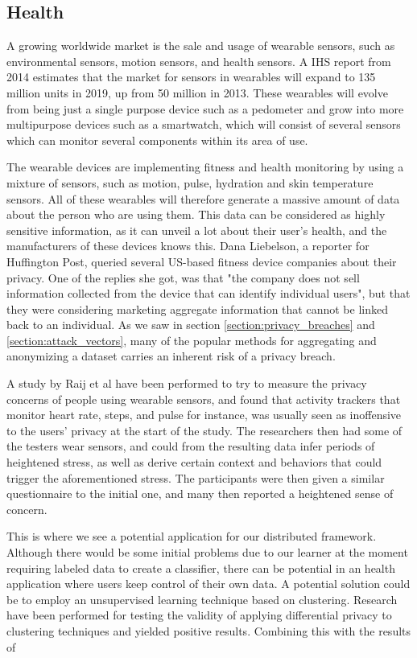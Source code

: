 \subsection{Health}
A growing worldwide market is the sale and usage of wearable sensors, such as environmental sensors, motion sensors, and health sensors. A IHS report \cite{ihs2014reportwearables} from 2014 estimates that the market for sensors in wearables will expand to 135 million units in 2019, up from 50 million in 2013. These wearables will evolve from being just a single purpose device such as a pedometer and grow into more multipurpose devices such as a smartwatch, which will consist of several sensors which can monitor several components within its area of use. 

The wearable devices are implementing fitness and health monitoring by using a mixture of sensors, such as motion, pulse, hydration and skin temperature sensors. All of these wearables will therefore generate a massive amount of data about the person who are using them. This data can be considered as highly sensitive information, as it can unveil a lot about their user's health, and the manufacturers of these devices knows this. Dana Liebelson, a reporter for Huffington Post, queried several US-based fitness device companies about their privacy. One of the replies she got, was that "the company does not sell information collected from the device that can identify individual users", but that they were considering marketing aggregate information that cannot be linked back to an individual. As we saw in section \ref{section:privacy_breaches} and \ref{section:attack_vectors}, many of the popular methods for aggregating and anonymizing a dataset carries an inherent risk of a privacy breach.

A study by Raij et al\cite{raij2011privacyConcernWearables} have been performed to try to measure the privacy concerns of people using wearable sensors, and found that activity trackers that monitor heart rate, steps, and pulse for instance, was usually seen as inoffensive to the users’ privacy at the start of the study. The researchers then had some of the testers wear sensors, and could from the resulting data infer periods of heightened stress, as well as derive certain context and behaviors that could trigger the aforementioned stress. The participants were then given a similar questionnaire to the initial one, and many then reported a heightened sense of concern. 
  
This is where we see a potential application for our distributed framework. Although there would be some initial problems due to our learner at the moment requiring labeled data to create a classifier, there can be potential in an health application where users keep control of their own data. A potential solution could be to employ an unsupervised learning technique based on clustering. Research have been performed for testing the validity of applying differential privacy to clustering techniques and yielded positive results. Combining this with the results of   

